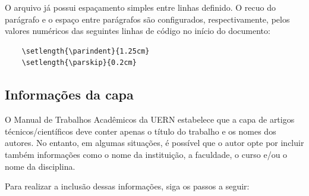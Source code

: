 \documentclass[
article,			%
12pt,				%
oneside,			%
a4paper,			%
english,			%
brazil,				%
sumario=tradicional
]{abntex2}
\begin{document}
    O arquivo já possui espaçamento simples entre linhas definido. O recuo do parágrafo e o espaço entre parágrafos são configurados, respectivamente, pelos valores numéricos das seguintes linhas de código no início do documento:

    \begin{verbatim}
    \setlength{\parindent}{1.25cm}
    \setlength{\parskip}{0.2cm}
    \end{verbatim}

    \subsection{Informações da capa}

    O Manual de Trabalhos Acadêmicos da UERN estabelece que a capa de artigos técnicos/científicos deve conter apenas o título do trabalho e os nomes dos autores. No entanto, em algumas situações, é possível que o autor opte por incluir também informações como o nome da instituição, a faculdade, o curso e/ou o nome da disciplina.

    Para realizar a inclusão dessas informações, siga os passos a seguir:
\end{document}
